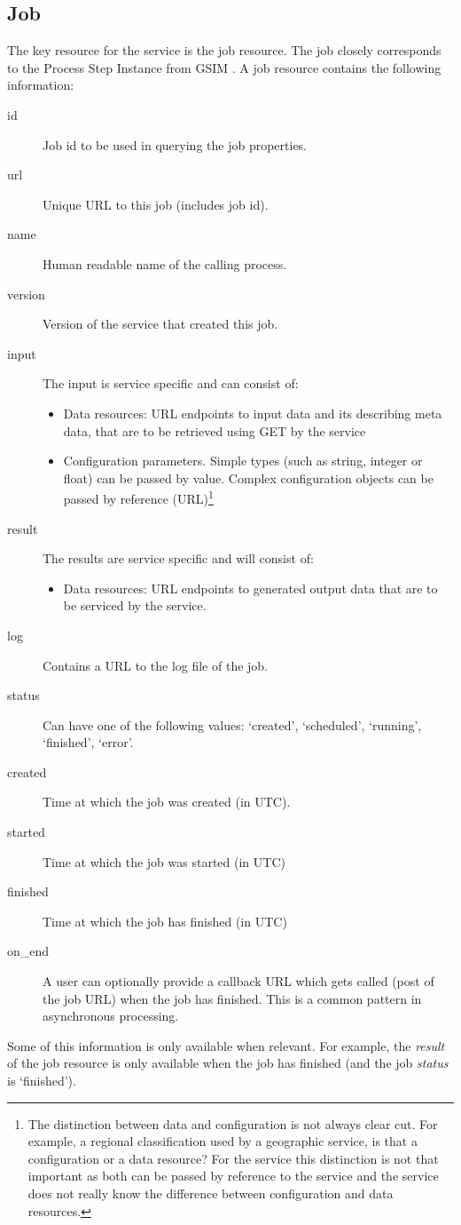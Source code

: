 \documentclass[a4paper]{article}
\begin{document}
\subsection{Job}

The key resource for the service is the job resource. The job closely
corresponds to the Process Step Instance from GSIM \citep{gsim2013}.  A job
resource contains the following information:
\begin{description}
  \item[id] Job id to be used in querying the job properties.
  \item[url] Unique URL to this job (includes job id).
  \item[name] Human readable name of the calling process.
  \item[version] Version of the service that created this job.
  \item[input] The input is service specific and can consist of:
    \begin{itemize}
      \item Data resources: URL endpoints to input data and its describing meta
      data, that are to be retrieved using GET by the service
      \item Configuration parameters. Simple types (such as string, integer or
      float) can be passed by value. Complex configuration objects can be passed
      by reference (URL)\footnote{The distinction between data and configuration
      is not always clear cut. For example, a regional classification used by a
      geographic service, is that a configuration or a data resource?  For the
      service this distinction is not that important as both can be passed by
      reference to the service and the service does not really know the
      difference between configuration and data resources.}
    \end{itemize}
  \item[result] The results are service specific and will consist of:
    \begin{itemize}
      \item Data resources: URL endpoints to generated output data that are to
      be serviced by the service.
    \end{itemize}
  \item[log] Contains a URL to the log file of the job. 
  \item[status] Can have one of the following values: `created', `scheduled',
  `running', `finished', `error'.
  \item[created] Time at which the job was created (in UTC).
  \item[started] Time at which the job was started (in UTC)
  \item[finished] Time at which the job has finished (in UTC)
  \item[on\_end] A user can optionally provide a callback URL which gets called
  (post of the job URL) when the job has finished. This is a common pattern in asynchronous processing.
\end{description}
Some of this information is only available when relevant. For example, the
\emph{result} of the job resource is only available when the job has finished
(and the job \emph{status} is `finished'). 
\end{document}

